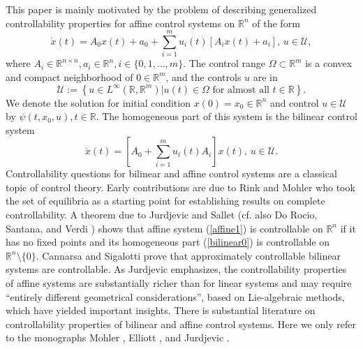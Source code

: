 \documentclass[preprint,12pt]{elsarticle}
\begin{document}
This paper is mainly motivated by the problem of describing generalized
controllability properties for affine control systems on $\mathbb{R}^{n}$ of
the form%
\begin{equation}
\dot{x}(t)=A_{0}x(t)+a_{0}+\sum_{i=1}^{m}u_{i}(t)[A_{i}x(t)+a_{i}%
],\,u\in\mathcal{U}, \label{affine1}%
\end{equation}
where $A_{i}\in\mathbb{R}^{n\times n},a_{i}\in\mathbb{R}^{n},i\in
\{0,1,\ldots,m\}$. The control range $\Omega\subset\mathbb{R}^{m}$ is a convex
and compact neighborhood of $0\in\mathbb{R}^{m}$, and the controls $u$ are in%
\begin{equation}
\mathcal{U}:=\left\{  u\in L^{\infty}(\mathbb{R},\mathbb{R}^{m})\left\vert
u(t)\in\Omega\text{ for almost all }t\in\mathbb{R}\right.  \right\}  .
\label{U}%
\end{equation}
We denote the solution for initial condition $x(0)=x_{0}\in\mathbb{R}^{n}$ and
control $u\in\mathcal{U}$ by $\psi(t,x_{0},u),t\in\mathbb{R}$. The homogeneous
part of this system is the bilinear control system%
\begin{equation}
\dot{x}(t)=[A_{0}+\sum_{i=1}^{m}u_{i}(t)A_{i}]x(t),\,u\in\mathcal{U}.
\label{bilinear0}%
\end{equation}
Controllability questions for bilinear and affine control systems are a
classical topic of control theory. Early contributions are due to Rink and
Mohler \cite{RinkM68} who took the set of equilibria as a starting point for
establishing results on complete controllability. A theorem due to Jurdjevic
and Sallet \cite[Theorem 2]{JurS84} (cf. also Do Rocio, Santana, and Verdi
\cite{DSC09}) shows that affine system (\ref{affine1}) is controllable on
$\mathbb{R}^{n}$ if it has no fixed points and its homogeneous part
(\ref{bilinear0}) is controllable on $\mathbb{R}^{n}\setminus\{0\}$. Cannarsa
and Sigalotti \cite{CanS21} prove that approximately controllable bilinear
systems are controllable. As Jurdjevic \cite[p. 182]{Jurd97} emphasizes, the
controllability properties of affine systems are substantially richer than for
linear systems and may require \textquotedblleft entirely different
geometrical considerations\textquotedblright, based on Lie-algebraic methods,
which have yielded important insights. There is substantial literature on
controllability properties of bilinear and affine control systems. Here we
only refer to the monographs Mohler \cite{Mohler}, Elliott \cite{Elliott}, and
Jurdjevic \cite{Jurd97}.
\end{document}
